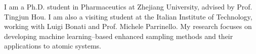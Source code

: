

\begin{cvparagraph}

I am a Ph.D. student in Pharmaceutics at Zhejiang University, advised by Prof. Tingjun Hou. I am also a visiting student at the Italian Institute of Technology, working with Luigi Bonati and Prof. Michele Parrinello. My research focuses on developing machine learning–based enhanced sampling methods and their applications to atomic systems. 
\vspace{-4mm}
\end{cvparagraph}

